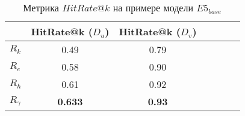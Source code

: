 \begin{table}[ht]
    \centering
    \begin{tabular}{lcccccc}
        \hline
        & \textbf{HitRate@k (\(D_u\))} & \textbf{HitRate@k (\(D_v\))} \\
       \hline
       \(R_k\)      &  0.49&  0.79 \\
       \(R_e\)      &  0.58&  0.90\\
       \(R_h\)      &  0.61&  0.92\\
       \(R_{\gamma}\) &  \textbf{0.633}&  \textbf{0.93}\\
       \hline
       \end{tabular}
    \caption{Метрика $HitRate@k$ на примере модели $E5_{base}$ \cite{e5}}
    \label{tab:hitrate-base}
\end{table}